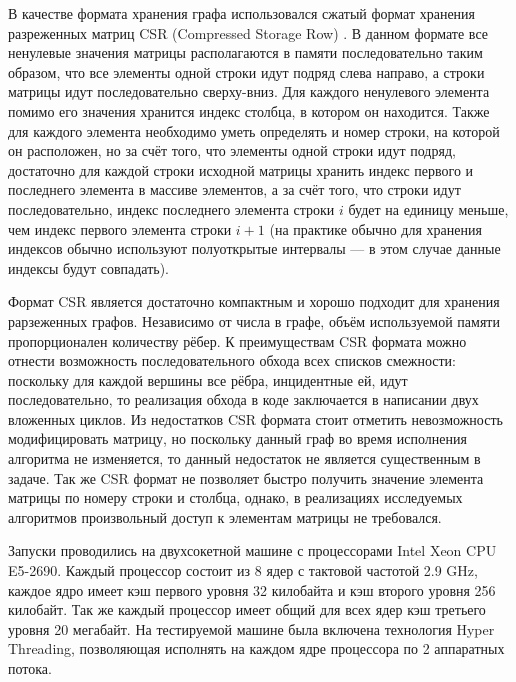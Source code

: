 \documentclass[a4paper,12pt]{extarticle}
\begin{document}
В качестве формата хранения графа использовался сжатый формат хранения разреженных матриц CSR (Compressed Storage Row) \cite{matrix-csr}.
В данном формате все ненулевые значения матрицы располагаются в памяти последовательно таким образом, что все элементы одной строки идут подряд слева направо, а строки матрицы идут последовательно сверху-вниз. 
Для каждого ненулевого элемента помимо его значения хранится индекс столбца, в котором он находится. 
Также для каждого элемента необходимо уметь определять и номер строки, на которой он расположен, но за счёт того, что элементы одной строки идут подряд, достаточно для каждой строки исходной матрицы хранить индекс первого и последнего элемента в массиве элементов, а за счёт того, что строки идут последовательно, индекс последнего элемента строки $i$ будет на единицу меньше, чем индекс первого элемента строки $i+1$ (на практике обычно для хранения индексов обычно используют полуоткрытые интервалы --- в этом случае данные индексы будут совпадать).

Формат CSR является достаточно компактным и хорошо подходит для хранения рарзеженных графов.
Независимо от числа в графе, объём используемой памяти пропорционален количеству рёбер.
К преимуществам CSR формата можно отнести возможность последовательного обхода всех списков смежности: поскольку для каждой вершины все рёбра, инцидентные ей, идут последовательно, то реализация обхода в коде заключается в написании двух вложенных циклов.
Из недостатков CSR формата стоит отметить невозможность модифицировать матрицу, но поскольку данный граф во время исполнения алгоритма не изменяется, то данный недостаток не является существенным в задаче. 
Так же CSR формат не позволяет быстро получить значение элемента матрицы по номеру строки и столбца, однако, в реализациях исследуемых алгоритмов произвольный доступ к элементам матрицы не требовался.

Запуски проводились на двухсокетной машине с процессорами Intel Xeon CPU E5-2690. Каждый процессор состоит из 8 ядер с тактовой частотой 2.9 GHz, каждое ядро имеет кэш первого уровня 32 килобайта и   кэш второго уровня 256 килобайт. Так же каждый процессор имеет общий для всех ядер кэш третьего уровня 20 мегабайт.
На тестируемой машине была включена технология Hyper Threading, позволяющая исполнять на каждом ядре процессора по 2 аппаратных потока.
\end{document}
